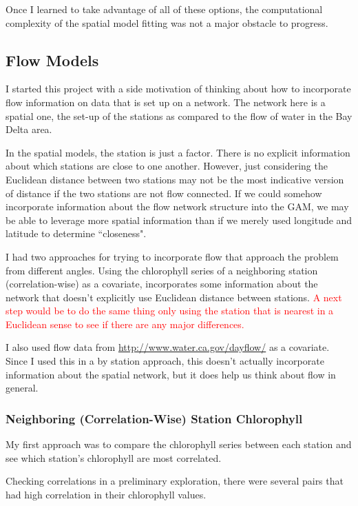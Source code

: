 \documentclass[12pt]{amsart}
\begin{document}
Once I learned to take advantage of all of these options, the computational complexity of the spatial model fitting was not a major obstacle to progress.

\subsection{Flow Models}

I started this project with a side motivation of thinking about how to incorporate flow information on data that is set up on a network. The network here is a spatial one, the set-up of the stations as compared to the flow of water in the Bay Delta area.

In the spatial models, the station is just a factor. There is no explicit information about which stations are close to one another. However, just considering the Euclidean distance between two stations may not be the most indicative version of distance if the two stations are not flow connected. If we could somehow incorporate information about the flow network structure into the GAM, we may be able to leverage more spatial information than if we merely used longitude and latitude to determine ``closeness".

I had two approaches for trying to incorporate flow that approach the problem from different angles. Using the chlorophyll series of a neighboring station (correlation-wise) as a covariate, incorporates some information about the network that doesn't explicitly use Euclidean distance between stations. \textcolor{red}{A next step would be to do the same thing only using the station that is nearest in a Euclidean sense to see if there are any major differences.}

I also used flow data from \url{http://www.water.ca.gov/dayflow/} as a covariate. Since I used this in a by station approach, this doesn't actually incorporate information about the spatial network, but it does help us think about flow in general. 



\subsubsection{Neighboring (Correlation-Wise) Station Chlorophyll}

My first approach was to compare the chlorophyll series between each station and see which station's chlorophyll are most correlated. 

Checking correlations in a preliminary exploration, there were several pairs that had high correlation in their chlorophyll values.
\end{document}
